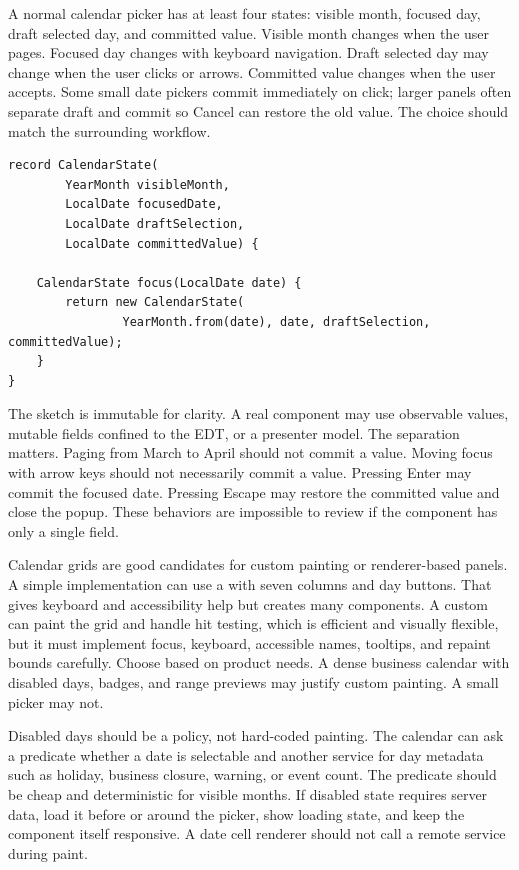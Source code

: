 A normal calendar picker has at least four states: visible month, focused day, draft
selected day, and committed value. Visible month changes when the user pages. Focused
day changes with keyboard navigation. Draft selected day may change when the user clicks
or arrows. Committed value changes when the user accepts. Some small date pickers commit
immediately on click; larger panels often separate draft and commit so Cancel can
restore the old value. The choice should match the surrounding workflow.

\begin{lstlisting}[caption={Calendar state separates visible month, focus, and value.}]
record CalendarState(
        YearMonth visibleMonth,
        LocalDate focusedDate,
        LocalDate draftSelection,
        LocalDate committedValue) {

    CalendarState focus(LocalDate date) {
        return new CalendarState(
                YearMonth.from(date), date, draftSelection, committedValue);
    }
}
\end{lstlisting}

The sketch is immutable for clarity. A real component may use observable values, mutable
fields confined to the EDT, or a presenter model. The separation matters. Paging from
March to April should not commit a value. Moving focus with arrow keys should not
necessarily commit a value. Pressing Enter may commit the focused date. Pressing Escape
may restore the committed value and close the popup. These behaviors are impossible to
review if the component has only a single
 field.

Calendar grids are good candidates for custom painting or renderer-based panels. A
simple implementation can use a  with seven columns and day buttons. That
gives keyboard and accessibility help but creates many components. A custom
 can paint the grid and handle hit testing, which is efficient and
visually flexible, but it must implement focus, keyboard, accessible names, tooltips,
and repaint bounds carefully. Choose based on product needs. A dense business calendar
with disabled days, badges, and range previews may justify custom painting. A small
picker may not.

Disabled days should be a policy, not hard-coded painting. The calendar can ask a
predicate whether a date is selectable and another service for day metadata such as
holiday, business closure, warning, or event count. The predicate should be cheap and
deterministic for visible months. If disabled state requires server data, load it before
or around the picker, show loading state, and keep the component itself responsive. A
date cell renderer should not call a remote service during paint.

